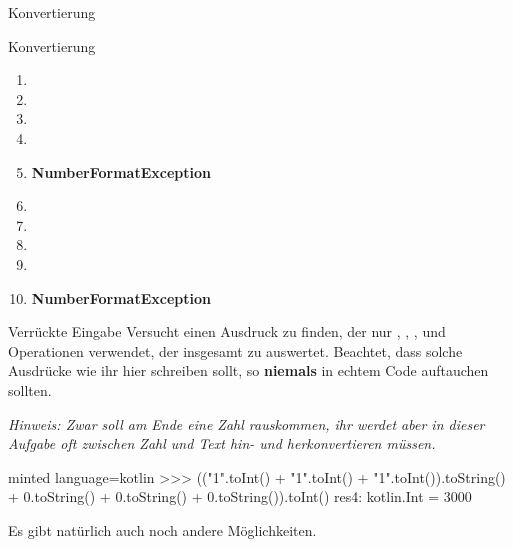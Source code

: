 \begin{task}[points=auto]{Konvertierung }
\begin{subtask*}[points=0]{Konvertierung}
        \begin{solution}
            \begin{multicols}{3}
                \begin{enumerate}
                    \item {}
                    \item {}
                    \item {}
                    \item {}
                    \item \textbf{NumberFormatException}
                    \item {}
                    \item {}
                    \item {}
                    \item {}
                    \item \textbf{NumberFormatException}
                \end{enumerate}
            \end{multicols}
        \end{solution}
    \end{subtask*}
    \begin{subtask*}[points=0]{Verrückte Eingabe }
        Versucht einen Ausdruck zu finden, der nur , ,
        ,  und Operationen verwendet, der
        insgesamt zu  auswertet. Beachtet, dass solche Ausdrücke
        wie ihr hier schreiben sollt, so \textbf{niemals} in echtem Code auftauchen
        sollten.

        \textit{Hinweis: Zwar soll am Ende eine Zahl rauskommen, ihr werdet aber in dieser Aufgabe oft zwischen Zahl und Text hin- und herkonvertieren müssen.}

        \begin{solution}
            \begin{codeBlock}[]{minted language=kotlin}
                >>> (("1".toInt() + "1".toInt() + "1".toInt()).toString() + 0.toString() + 0.toString() + 0.toString()).toInt()
                res4: kotlin.Int = 3000
            \end{codeBlock}
            Es gibt natürlich auch noch andere Möglichkeiten.
        \end{solution}
    \end{subtask*}
\end{task}
